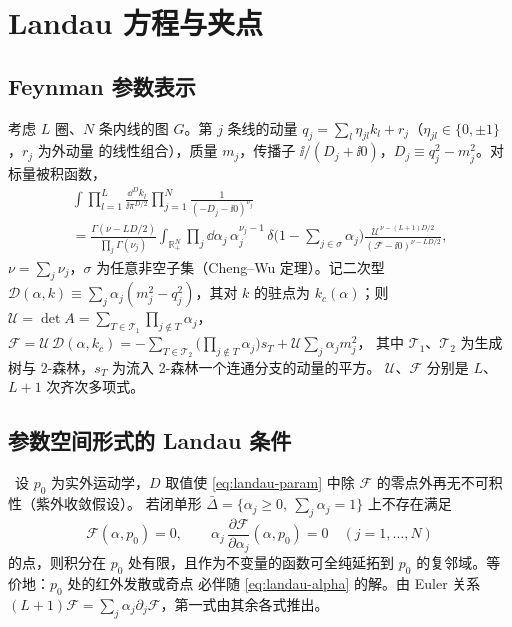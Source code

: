 \section{Landau 方程与夹点}
\label{sec:landau}

\subsection{Feynman 参数表示}

考虑 $L$ 圈、$N$ 条内线的图 $G$。第 $j$ 条线的动量 $q_j=\sum_l\eta_{jl}k_l+r_j$（$\eta_{jl}\in\{0,\pm1\}$，$r_j$ 为外动量
的线性组合），质量 $m_j$，传播子 $\ii/(D_j+\ii0)$，$D_j\equiv q_j^2-m_j^2$。对标量被积函数，
\begin{multline}\label{eq:landau-param}
\int\prod_{l=1}^{L}\frac{\dd^Dk_l}{\ii\pi^{D/2}}\prod_{j=1}^{N}\frac{1}{(-D_j-\ii0)^{\nu_j}}\\
=\frac{\Gamma(\nu-LD/2)}{\prod_j\Gamma(\nu_j)}\int_{\mathbb R_+^N}\prod_j\dd\alpha_j\,\alpha_j^{\nu_j-1}\,
\delta\Big(1-\sum_{j\in\sigma}\alpha_j\Big)\frac{\mathcal U^{\,\nu-(L+1)D/2}}{(\mathcal F-\ii0)^{\nu-LD/2}},
\end{multline}
$\nu=\sum_j\nu_j$，$\sigma$ 为任意非空子集（Cheng--Wu 定理）。记二次型
$\mathcal D(\alpha,k)\equiv\sum_j\alpha_j(m_j^2-q_j^2)$，其对 $k$ 的驻点为 $k_c(\alpha)$；则
$\mathcal U=\det A=\sum_{T\in\mathcal T_1}\prod_{j\notin T}\alpha_j$，
$\mathcal F=\mathcal U\,\mathcal D(\alpha,k_c)=-\sum_{T\in\mathcal T_2}\big(\prod_{j\notin T}\alpha_j\big)s_T+\mathcal U\sum_j\alpha_jm_j^2$，
其中 $\mathcal T_{1}$、$\mathcal T_{2}$ 为生成树与 2-森林，$s_T$ 为流入 2-森林一个连通分支的动量的平方。
$\mathcal U$、$\mathcal F$ 分别是 $L$、$L+1$ 次齐次多项式。

\subsection{参数空间形式的 Landau 条件}

\begin{theorem}\label{thm:landau-alpha}\tagR\
设 $p_0$ 为实外运动学，$D$ 取值使 \cref{eq:landau-param} 中除 $\mathcal F$ 的零点外再无不可积性（紫外收敛假设）。
若闭单形 $\bar\Delta=\{\alpha_j\ge0,\ \sum_j\alpha_j=1\}$ 上不存在满足
\begin{equation}\label{eq:landau-alpha}
\mathcal F(\alpha,p_0)=0,\qquad \alpha_j\,\frac{\partial\mathcal F}{\partial\alpha_j}(\alpha,p_0)=0\quad(j=1,\dots,N)
\end{equation}
的点，则积分在 $p_0$ 处有限，且作为不变量的函数可全纯延拓到 $p_0$ 的复邻域。等价地：$p_0$ 处的红外发散或奇点
必伴随 \cref{eq:landau-alpha} 的解。由 Euler 关系 $(L+1)\mathcal F=\sum_j\alpha_j\partial_j\mathcal F$，第一式由其余各式推出。
\end{theorem}

